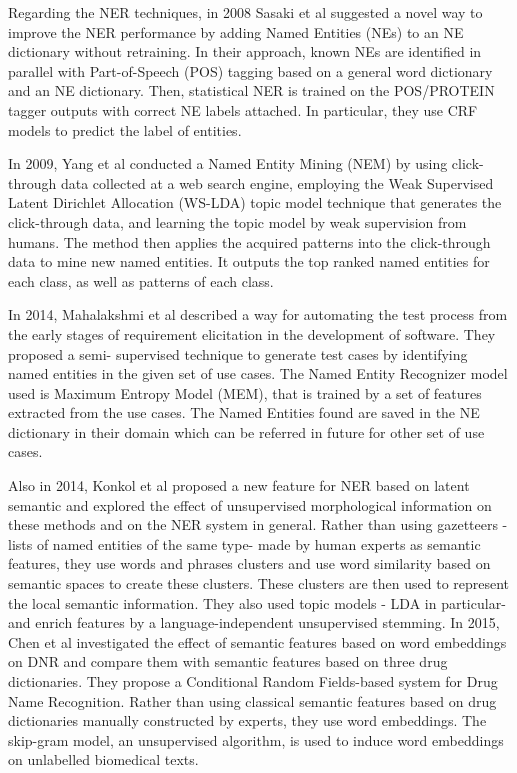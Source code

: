\documentclass[b5paper,]{book}
\theoremstyle{definition}
\theoremstyle{definition}
\theoremstyle{definition}
\theoremstyle{remark}
\begin{document}
Regarding the NER techniques, in 2008 Sasaki et al
\citep{sasaki2008make} suggested a novel way to improve the NER
performance by adding Named Entities (NEs) to an NE dictionary without
retraining. In their approach, known NEs are identified in parallel with
Part-of-Speech (POS) tagging based on a general word dictionary and an
NE dictionary. Then, statistical NER is trained on the POS/PROTEIN
tagger outputs with correct NE labels attached. In particular, they use
CRF models to predict the label of entities.

In 2009, Yang et al \citep{xu2009named} conducted a Named Entity Mining
(NEM) by using click-through data collected at a web search engine,
employing the Weak Supervised Latent Dirichlet Allocation (WS-LDA) topic
model technique that generates the click-through data, and learning the
topic model by weak supervision from humans. The method then applies the
acquired patterns into the click-through data to mine new named
entities. It outputs the top ranked named entities for each class, as
well as patterns of each class.

In 2014, Mahalakshmi et al \citep{mahalakshmi2018named} described a way
for automating the test process from the early stages of requirement
elicitation in the development of software. They proposed a semi-
supervised technique to generate test cases by identifying named
entities in the given set of use cases. The Named Entity Recognizer
model used is Maximum Entropy Model (MEM), that is trained by a set of
features extracted from the use cases. The Named Entities found are
saved in the NE dictionary in their domain which can be referred in
future for other set of use cases.

Also in 2014, Konkol et al \citep{konkol2015latent} proposed a new
feature for NER based on latent semantic and explored the effect of
unsupervised morphological information on these methods and on the NER
system in general. Rather than using gazetteers -lists of named entities
of the same type- made by human experts as semantic features, they use
words and phrases clusters and use word similarity based on semantic
spaces to create these clusters. These clusters are then used to
represent the local semantic information. They also used topic models -
LDA in particular- and enrich features by a language-independent
unsupervised stemming. In 2015, Chen et al \citep{liu2015effects}
investigated the effect of semantic features based on word embeddings on
DNR and compare them with semantic features based on three drug
dictionaries. They propose a Conditional Random Fields-based system for
Drug Name Recognition. Rather than using classical semantic features
based on drug dictionaries manually constructed by experts, they use
word embeddings. The skip-gram model, an unsupervised algorithm, is used
to induce word embeddings on unlabelled biomedical texts.
\end{document}
